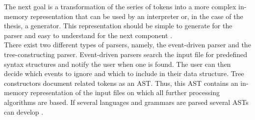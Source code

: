 The next goal is a transformation of the series of tokens into a more complex in-memory representation that can be used by an interpreter or, in the case of the thesis, a generator. This representation should be simple to generate for the parser and easy to understand for the next component \parencite[cf.][p. 59]{nystrom_crafting_2021}.\\
There exist two different types of parsers, namely, the event-driven parser and the tree-constructing parser. Event-driven parsers search the input file for predefined syntax structures and notify the user when one is found. The user can then decide which events to ignore and which to include in their data structure. Tree constructors document related tokens as an \ac{AST}. Thus, this \ac{AST} contains an in-memory representation of the input files on which all further processing algorithms are based. If several languages and grammars are parsed several \ac{AST}s can develop \parencite[cf.][pp. 5-6]{sarkar_code_2001}.